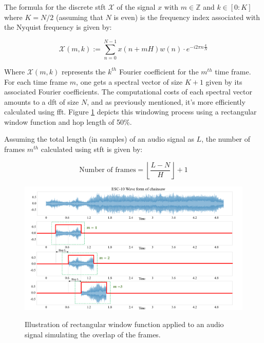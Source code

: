 The formula for the discrete \gls{stft} $\mathcal{X}$ of the signal $x$ with $m \in \mathbb{Z}$ and $k \in [0:K]$ where $K = N/2$ (assuming that $N$ is even) is the frequency index associated with the Nyquist frequency is given by:

\begin{equation}
    \label{eq:frmwk_stft_discrete_stft}
    \mathcal{X}(m, k):=\sum_{n=0}^{N-1} x(n+m H) w(n) \cdot e^{-i 2 \pi n \frac{k}{N}}
\end{equation}

Where $\mathcal{X}(m, k)$ represents the $k^{th}$ Fourier coefficient for the $m^{th}$ time frame. For each time frame $m$, one gets a spectral vector of size $K+1$ given by its associated Fourier coefficients. The computational costs of each spectral vector amounts to a \gls{dft} of size $N$, and as previously mentioned, it's more efficiently calculated using \gls{fft}. Figure \ref{fig:frmwk_stft_windowing} depicts this windowing process using a rectangular window function and hop length of 50\%.

Assuming the total length (in samples) of an audio signal as $L$, the number of frames $m^{th}$ calculated using \gls{stft} is given by:

\begin{equation}
    \label{eq:frmwk_stft_frames}
    \text{Number of frames} = \left\lfloor \frac{L-N}{H} \right\rfloor + 1
\end{equation}

\begin{figure}[htbp]
    \raggedright
        \caption{Illustration of rectangular window function applied to an audio signal simulating the overlap of the frames.}
        \includegraphics[width=1.0\textwidth]{resources/images/030-theoretical_framework/Framework_stft_windowing.png}
        \label{fig:frmwk_stft_windowing}
\end{figure}


